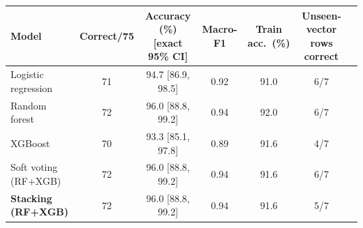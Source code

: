 \begin{tabular}{@{}lcccccc@{}}
\toprule
Model & Correct/75 & Accuracy (\%) [exact 95\% CI] & Macro-F1 & Train acc.\ (\%) & Unseen-vector rows correct\\
\midrule
Logistic regression & 71 & 94.7 [86.9, 98.5] & 0.92 & 91.0 & 6/7\\
Random forest & 72 & 96.0 [88.8, 99.2] & 0.94 & 92.0 & 6/7\\
XGBoost & 70 & 93.3 [85.1, 97.8] & 0.89 & 91.6 & 4/7\\
Soft voting (RF+XGB) & 72 & 96.0 [88.8, 99.2] & 0.94 & 91.6 & 6/7\\
\textbf{Stacking (RF+XGB)} & 72 & 96.0 [88.8, 99.2] & 0.94 & 91.6 & 5/7\\
\bottomrule
\end{tabular}